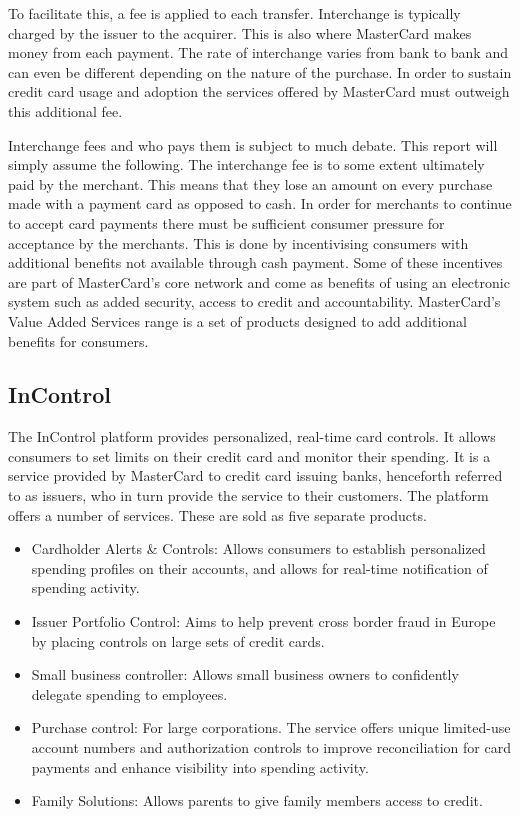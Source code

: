 \documentclass[a4paper, 11pt, titlepage]{article}
\begin{document}
To facilitate this, a fee is applied to each transfer. Interchange is typically charged by the issuer to the acquirer. This is also where MasterCard makes money from each payment. The rate of interchange varies from bank to bank and can even be different depending on the nature of the purchase. In order to sustain credit card usage and adoption the services offered by MasterCard must outweigh this additional fee.

Interchange fees and who pays them is subject to much debate. This report will simply assume the following. The interchange fee is to some extent ultimately paid by the merchant. This means that they lose an amount on every purchase made with a payment card as opposed to cash. In order for merchants to continue to accept card payments there must be sufficient consumer pressure for acceptance by the merchants. This is done by incentivising consumers with additional benefits not available through cash payment. Some of these incentives are part of MasterCard’s core network and come as benefits of using an electronic system such as added security, access to credit and accountability. MasterCard’s Value Added Services range is a set of products designed to add additional benefits for consumers. 
\cite{mcInterchange} 
 
\subsection{InControl} 
The InControl platform provides personalized, real-time card controls. It allows consumers to set limits on their credit card and monitor their spending. It is a service provided by MasterCard to credit card issuing banks, henceforth referred to as issuers, who in turn provide the service to their customers. The platform offers a number of services. These are sold as five separate products. 
\begin{itemize} 
\item Cardholder Alerts \& Controls: Allows consumers to establish personalized spending profiles on their accounts, and allows for real-time notification of spending activity. 
\item Issuer Portfolio Control: Aims to help prevent cross border fraud in Europe by placing controls on large sets of credit cards. 
\item Small business controller: Allows small business owners to confidently delegate spending to employees. 
\item Purchase control: For large corporations. The service offers unique limited-use account numbers and authorization controls to improve reconciliation for card payments and enhance visibility into spending activity. 
\item Family Solutions: Allows parents to give family members access to credit. 
\end{itemize} 
 
\end{document}
